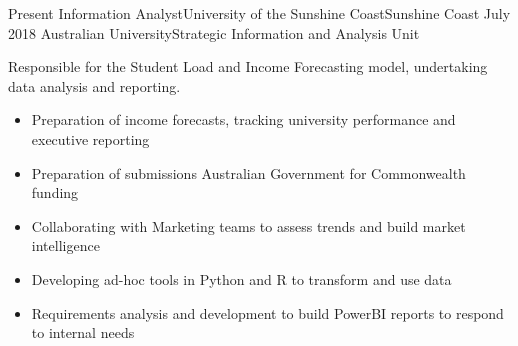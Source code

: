 %
%
%

\begin{experiences}
  \consultantexperience
    {Present}   {Information Analyst}{University of the Sunshine Coast}{Sunshine Coast}
    {July 2018}  {Australian University}{Strategic Information and Analysis Unit}
    {Responsible for the Student Load and Income Forecasting model, undertaking data analysis and reporting.
                      \begin{itemize}
		\item Preparation of income forecasts, tracking university performance and executive reporting
		\item Preparation of submissions Australian Government for Commonwealth funding
		\item Collaborating with Marketing teams to assess trends and build market intelligence 
		\item Developing ad-hoc tools in Python and R to transform and use data
		\item Requirements analysis and development to build PowerBI reports to respond to internal needs
                                                              

\end{itemize}}
\end{experiences}
